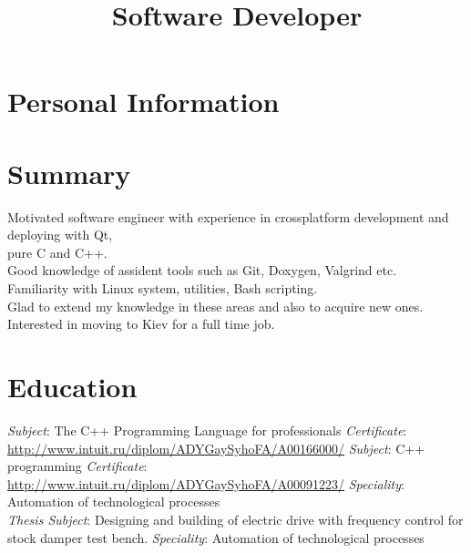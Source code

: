\documentclass[11pt,a4paper]{moderncv}
\title{Software Developer}
\begin{document}
\maketitle

\section{Personal Information}

\section{Summary}
Motivated software engineer with experience in crossplatform development and deploying with Qt, \\pure C and C++.\\
Good knowledge of assident tools such as Git, Doxygen, Valgrind etc.\\
Familiarity with Linux system, utilities, Bash scripting.\\
Glad to extend my knowledge in these areas and also to acquire new ones.\\
Interested in moving to Kiev for a full time job.

\section{Education}
{\textit{Subject}: The C++ Programming Language for professionals
\newline \textit{Certificate}: {\color{web} \url{http://www.intuit.ru/diplom/ADYGaySyhoFA/A00166000/}}}
{\textit{Subject}: C++ programming
\newline \textit{Certificate}: {\color{web} \url{http://www.intuit.ru/diplom/ADYGaySyhoFA/A00091223/}}}
{\textit{Speciality}: Automation of technological processes\\
 \textit{Thesis Subject}: Designing and building of electric drive with frequency control for stock damper test bench.}
{\textit{Speciality}: Automation of technological processes}
\end{document}
